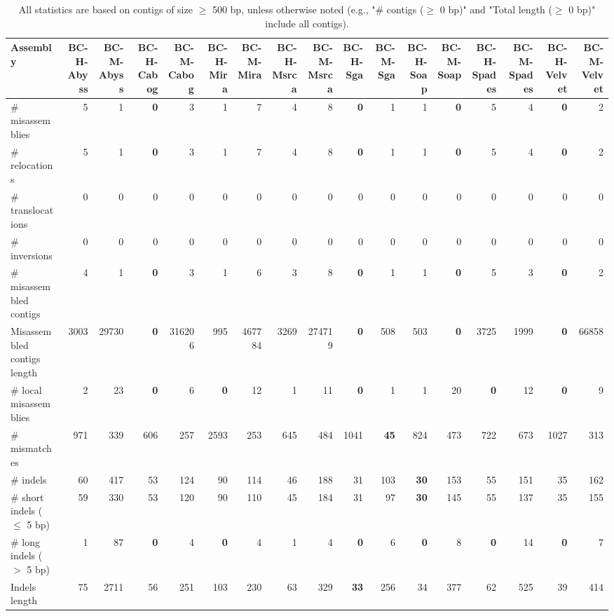 \documentclass[12pt,a4paper]{article}
\begin{document}
\begin{table}[ht]
\begin{center}
\caption{All statistics are based on contigs of size $\geq$ 500 bp, unless otherwise noted (e.g., "\# contigs ($\geq$ 0 bp)" and "Total length ($\geq$ 0 bp)" include all contigs).}
\begin{tabular}{|l*{16}{|r}|}
\hline
Assembly & BC-H-Abyss & BC-M-Abyss & BC-H-Cabog & BC-M-Cabog & BC-H-Mira & BC-M-Mira & BC-H-Msrca & BC-M-Msrca & BC-H-Sga & BC-M-Sga & BC-H-Soap & BC-M-Soap & BC-H-Spades & BC-M-Spades & BC-H-Velvet & BC-M-Velvet \\ \hline
\# misassemblies & 5 & 1 & {\bf 0} & 3 & 1 & 7 & 4 & 8 & {\bf 0} & 1 & 1 & {\bf 0} & 5 & 4 & {\bf 0} & 2 \\ \hline
\hspace{5mm}\# relocations & 5 & 1 & {\bf 0} & 3 & 1 & 7 & 4 & 8 & {\bf 0} & 1 & 1 & {\bf 0} & 5 & 4 & {\bf 0} & 2 \\ \hline
\hspace{5mm}\# translocations & 0 & 0 & 0 & 0 & 0 & 0 & 0 & 0 & 0 & 0 & 0 & 0 & 0 & 0 & 0 & 0 \\ \hline
\hspace{5mm}\# inversions & 0 & 0 & 0 & 0 & 0 & 0 & 0 & 0 & 0 & 0 & 0 & 0 & 0 & 0 & 0 & 0 \\ \hline
\# misassembled contigs & 4 & 1 & {\bf 0} & 3 & 1 & 6 & 3 & 8 & {\bf 0} & 1 & 1 & {\bf 0} & 5 & 3 & {\bf 0} & 2 \\ \hline
Misassembled contigs length & 3003 & 29730 & {\bf 0} & 316206 & 995 & 467784 & 3269 & 274719 & {\bf 0} & 508 & 503 & {\bf 0} & 3725 & 1999 & {\bf 0} & 66858 \\ \hline
\# local misassemblies & 2 & 23 & {\bf 0} & 6 & {\bf 0} & 12 & 1 & 11 & {\bf 0} & 1 & 1 & 20 & {\bf 0} & 12 & {\bf 0} & 9 \\ \hline
\# mismatches & 971 & 339 & 606 & 257 & 2593 & 253 & 645 & 484 & 1041 & {\bf 45} & 824 & 473 & 722 & 673 & 1027 & 313 \\ \hline
\# indels & 60 & 417 & 53 & 124 & 90 & 114 & 46 & 188 & 31 & 103 & {\bf 30} & 153 & 55 & 151 & 35 & 162 \\ \hline
\hspace{5mm}\# short indels ($\leq$ 5 bp) & 59 & 330 & 53 & 120 & 90 & 110 & 45 & 184 & 31 & 97 & {\bf 30} & 145 & 55 & 137 & 35 & 155 \\ \hline
\hspace{5mm}\# long indels ($>$ 5 bp) & 1 & 87 & {\bf 0} & 4 & {\bf 0} & 4 & 1 & 4 & {\bf 0} & 6 & {\bf 0} & 8 & {\bf 0} & 14 & {\bf 0} & 7 \\ \hline
Indels length & 75 & 2711 & 56 & 251 & 103 & 230 & 63 & 329 & {\bf 33} & 256 & 34 & 377 & 62 & 525 & 39 & 414 \\ \hline
\end{tabular}
\end{center}
\end{table}
\end{document}
